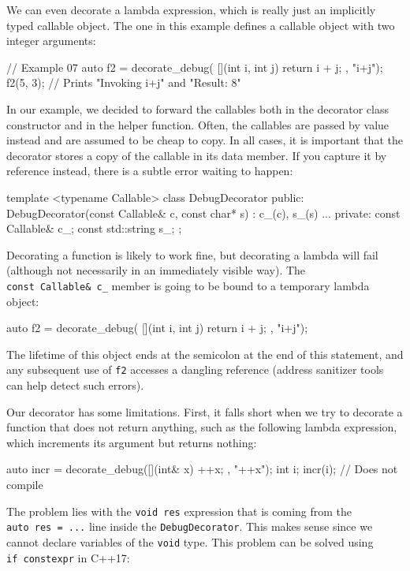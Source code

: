 We can even decorate a lambda expression, which is really just an implicitly typed callable object. The one in this example defines a callable object with two integer arguments:

\begin{code}
// Example 07
auto f2 = decorate_debug(
  [](int i, int j) { return i + j; }, "i+j");
f2(5, 3); // Prints "Invoking i+j" and "Result: 8"
\end{code}

In our example, we decided to forward the callables both in the decorator class constructor and in the helper function. Often, the callables are passed by value instead and are assumed to be cheap to copy. In all cases, it is important that the decorator stores a copy of the callable in its data member. If you capture it by reference instead, there is a subtle error waiting to happen:

\begin{code}
template <typename Callable> class DebugDecorator {
  public:
  DebugDecorator(const Callable& c, const char* s) :
    c_(c), s_(s) {}
  ...
  private:
  const Callable& c_;
  const std::string s_;
};
\end{code}

Decorating a function is likely to work fine, but decorating a lambda will fail (although not necessarily in an immediately visible way). The \texttt{const\ Callable\&\ c\_} member is going to be bound to a temporary lambda object:

\begin{code}
auto f2 = decorate_debug(
  [](int i, int j) { return i + j; }, "i+j");
\end{code}

The lifetime of this object ends at the semicolon at the end of this statement, and any subsequent use of \texttt{f2} accesses a dangling reference (address sanitizer tools can help detect such errors).

Our decorator has some limitations. First, it falls short when we try to decorate a function that does not return anything, such as the following lambda expression, which increments its argument but returns nothing:

\begin{code}
auto incr = decorate_debug([](int& x) { ++x; }, "++x");
int i;
incr(i); // Does not compile
\end{code}

The problem lies with the \texttt{void\ res} expression that is coming from the \texttt{auto\ res\ =\ ...} line inside the \texttt{DebugDecorator}. This makes sense since we cannot declare variables of the \texttt{void} type. This problem can be solved using \texttt{if\ constexpr} in C++17:

